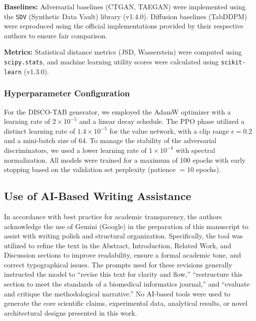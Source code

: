 \documentclass[journal,twoside,web]{ieeecolor}
\begin{document}
\textbf{Baselines:} Adversarial baselines (CTGAN, TAEGAN) were implemented using the \texttt{SDV} (Synthetic Data Vault) library (v1.4.0). Diffusion baselines (TabDDPM) were reproduced using the official implementations provided by their respective authors to ensure fair comparison.

\textbf{Metrics:} Statistical distance metrics (JSD, Wasserstein) were computed using \texttt{scipy.stats}, and machine learning utility scores were calculated using \texttt{scikit-learn} (v1.3.0).

\subsubsection{Hyperparameter Configuration}
For the DISCO-TAB generator, we employed the AdamW optimizer with a learning rate of $2 \times 10^{-5}$ and a linear decay schedule. The PPO phase utilized a distinct learning rate of $1.4 \times 10^{-5}$ for the value network, with a clip range $\epsilon = 0.2$ and a mini-batch size of 64. To manage the stability of the adversarial discriminators, we used a lower learning rate of $1 \times 10^{-4}$ with spectral normalization. All models were trained for a maximum of 100 epochs with early stopping based on the validation set perplexity (patience $= 10$ epochs).

\subsection{Use of AI-Based Writing Assistance}
In accordance with best practice for academic transparency, the authors acknowledge the use of Gemini (Google) in the preparation of this manuscript to assist with writing polish and structural organization. Specifically, the tool was utilized to refine the text in the Abstract, Introduction, Related Work, and Discussion sections to improve readability, ensure a formal academic tone, and correct typographical issues. The prompts used for these revisions generally instructed the model to ``revise this text for clarity and flow,'' ``restructure this section to meet the standards of a biomedical informatics journal,'' and ``evaluate and critique the methodological narrative.'' No AI-based tools were used to generate the core scientific claims, experimental data, analytical results, or novel architectural designs presented in this work.


\end{document}
